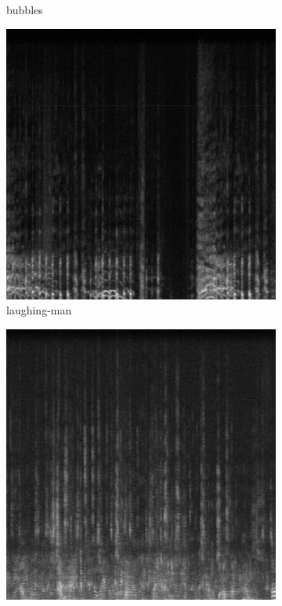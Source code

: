 \documentclass[a4paper,10pt,final]{ThesisStyle}
\begin{document}
\begin{figure}
\begin{subfigure}[b]{0.25\textwidth}
                \caption{bubbles}
        \end{subfigure}%
        \begin{subfigure}[b]{0.25\textwidth}
                \centering
                \includegraphics[width=\textwidth]{images/laughing-man.pdf}
                \caption{laughing-man}
        \end{subfigure}%
        \begin{subfigure}[b]{0.25\textwidth}
                \centering
                \includegraphics[width=\textwidth]{images/conversation.pdf}

\end{subfigure}
\end{figure}
\end{document}
